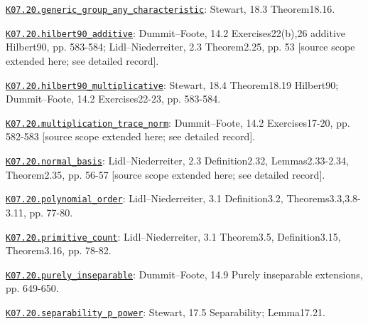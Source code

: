 \par\smallskip\noindent\hypertarget{src:K07.20.generic_group_any_characteristic}{}\label{src:K07.20.generic_group_any_characteristic}\hyperref[K07.20.generic_group_any_characteristic]{\texttt{K07.20.generic\_group\_any\_characteristic}}: Stewart, 18.3 Theorem18.16.
\par\smallskip\noindent\hypertarget{src:K07.20.hilbert90_additive}{}\label{src:K07.20.hilbert90_additive}\hyperref[K07.20.hilbert90_additive]{\texttt{K07.20.hilbert90\_additive}}: Dummit--Foote, 14.2 Exercises22(b),26 additive Hilbert90, pp. 583-584; Lidl--Niederreiter, 2.3 Theorem2.25, pp. 53 [source scope extended here; see detailed record].
\par\smallskip\noindent\hypertarget{src:K07.20.hilbert90_multiplicative}{}\label{src:K07.20.hilbert90_multiplicative}\hyperref[K07.20.hilbert90_multiplicative]{\texttt{K07.20.hilbert90\_multiplicative}}: Stewart, 18.4 Theorem18.19 Hilbert90; Dummit--Foote, 14.2 Exercises22-23, pp. 583-584.
\par\smallskip\noindent\hypertarget{src:K07.20.multiplication_trace_norm}{}\label{src:K07.20.multiplication_trace_norm}\hyperref[K07.20.multiplication_trace_norm]{\texttt{K07.20.multiplication\_trace\_norm}}: Dummit--Foote, 14.2 Exercises17-20, pp. 582-583 [source scope extended here; see detailed record].
\par\smallskip\noindent\hypertarget{src:K07.20.normal_basis}{}\label{src:K07.20.normal_basis}\hyperref[K07.20.normal_basis]{\texttt{K07.20.normal\_basis}}: Lidl--Niederreiter, 2.3 Definition2.32, Lemmas2.33-2.34, Theorem2.35, pp. 56-57 [source scope extended here; see detailed record].
\par\smallskip\noindent\hypertarget{src:K07.20.polynomial_order}{}\label{src:K07.20.polynomial_order}\hyperref[K07.20.polynomial_order]{\texttt{K07.20.polynomial\_order}}: Lidl--Niederreiter, 3.1 Definition3.2, Theorems3.3,3.8-3.11, pp. 77-80.
\par\smallskip\noindent\hypertarget{src:K07.20.primitive_count}{}\label{src:K07.20.primitive_count}\hyperref[K07.20.primitive_count]{\texttt{K07.20.primitive\_count}}: Lidl--Niederreiter, 3.1 Theorem3.5, Definition3.15, Theorem3.16, pp. 78-82.
\par\smallskip\noindent\hypertarget{src:K07.20.purely_inseparable}{}\label{src:K07.20.purely_inseparable}\hyperref[K07.20.purely_inseparable]{\texttt{K07.20.purely\_inseparable}}: Dummit--Foote, 14.9 Purely inseparable extensions, pp. 649-650.
\par\smallskip\noindent\hypertarget{src:K07.20.separability_p_power}{}\label{src:K07.20.separability_p_power}\hyperref[K07.20.separability_p_power]{\texttt{K07.20.separability\_p\_power}}: Stewart, 17.5 Separability; Lemma17.21.
